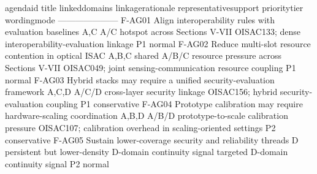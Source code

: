 {}\markdownRendererPipe{} agenda\markdownRendererUnderscore{}id \markdownRendererPipe{} title \markdownRendererPipe{} linked\markdownRendererUnderscore{}domains \markdownRendererPipe{} linkage\markdownRendererUnderscore{}rationale \markdownRendererPipe{} representative\markdownRendererUnderscore{}support \markdownRendererPipe{} priority\markdownRendererUnderscore{}tier \markdownRendererPipe{} wording\markdownRendererUnderscore{}mode \markdownRendererPipe{}\markdownRendererSoftLineBreak
{}\markdownRendererPipe{}---\markdownRendererPipe{}---\markdownRendererPipe{}---\markdownRendererPipe{}---\markdownRendererPipe{}---\markdownRendererPipe{}---\markdownRendererPipe{}---\markdownRendererPipe{}\markdownRendererSoftLineBreak
{}\markdownRendererPipe{} F-AG01 \markdownRendererPipe{} Align interoperability rules with evaluation baselines \markdownRendererPipe{} A,C \markdownRendererPipe{} A/C hotspot across Sections V-VII \markdownRendererPipe{} O\markdownRendererUnderscore{}ISAC\markdownRendererUnderscore{}133; dense interoperability-evaluation linkage \markdownRendererPipe{} P1 \markdownRendererPipe{} normal \markdownRendererPipe{}\markdownRendererSoftLineBreak
{}\markdownRendererPipe{} F-AG02 \markdownRendererPipe{} Reduce multi-slot resource contention in optical ISAC \markdownRendererPipe{} A,B,C \markdownRendererPipe{} shared A/B/C resource pressure across Sections V-VII \markdownRendererPipe{} O\markdownRendererUnderscore{}ISAC\markdownRendererUnderscore{}049; joint sensing-communication resource coupling \markdownRendererPipe{} P1 \markdownRendererPipe{} normal \markdownRendererPipe{}\markdownRendererSoftLineBreak
{}\markdownRendererPipe{} F-AG03 \markdownRendererPipe{} Hybrid stacks may require a unified security-evaluation framework \markdownRendererPipe{} A,C,D \markdownRendererPipe{} A/C/D cross-layer security linkage \markdownRendererPipe{} O\markdownRendererUnderscore{}ISAC\markdownRendererUnderscore{}156; hybrid security-evaluation coupling \markdownRendererPipe{} P1 \markdownRendererPipe{} conservative \markdownRendererPipe{}\markdownRendererSoftLineBreak
{}\markdownRendererPipe{} F-AG04 \markdownRendererPipe{} Prototype calibration may require hardware-scaling coordination \markdownRendererPipe{} A,B,D \markdownRendererPipe{} A/B/D prototype-to-scale calibration pressure \markdownRendererPipe{} O\markdownRendererUnderscore{}ISAC\markdownRendererUnderscore{}107; calibration overhead in scaling-oriented settings \markdownRendererPipe{} P2 \markdownRendererPipe{} conservative \markdownRendererPipe{}\markdownRendererSoftLineBreak
{}\markdownRendererPipe{} F-AG05 \markdownRendererPipe{} Sustain lower-coverage security and reliability threads \markdownRendererPipe{} D \markdownRendererPipe{} persistent but lower-density D-domain continuity signal \markdownRendererPipe{} targeted D-domain continuity signal \markdownRendererPipe{} P2 \markdownRendererPipe{} normal \markdownRendererPipe{}\markdownRendererSoftLineBreak
